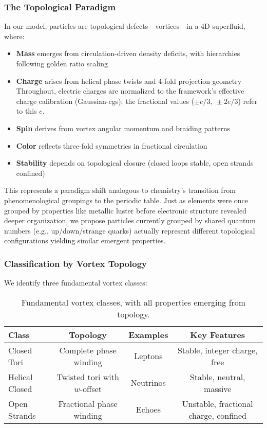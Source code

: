 \subsubsection{The Topological Paradigm}

In our model, particles are topological defects—vortices—in a 4D superfluid, where:
\begin{itemize}
\item \textbf{Mass} emerges from circulation-driven density deficits, with hierarchies following golden ratio scaling
\item \textbf{Charge} arises from helical phase twists and 4-fold projection geometry
Throughout, electric charges are normalized to the framework's effective charge calibration (Gaussian-cgs); the fractional values ($\pm e/3,\ \pm 2e/3$) refer to this $e$.
\item \textbf{Spin} derives from vortex angular momentum and braiding patterns
\item \textbf{Color} reflects three-fold symmetries in fractional circulation
\item \textbf{Stability} depends on topological closure (closed loops stable, open strands confined)
\end{itemize}

This represents a paradigm shift analogous to chemistry's transition from phenomenological groupings to the periodic table. Just as elements were once grouped by properties like metallic luster before electronic structure revealed deeper organization, we propose particles currently grouped by shared quantum numbers (e.g., up/down/strange quarks) actually represent different topological configurations yielding similar emergent properties.

\subsubsection{Classification by Vortex Topology}

We identify three fundamental vortex classes:

\begin{table}[h!]
\centering
\begin{tabular}{|l|c|c|c|}
\hline
Class & Topology & Examples & Key Features \\
\hline
Closed Tori & Complete phase winding & Leptons & Stable, integer charge, free \\
Helical Closed & Twisted tori with $w$-offset & Neutrinos & Stable, neutral, massive \\
Open Strands & Fractional phase winding & Echoes & Unstable, fractional charge, confined \\
\hline
\end{tabular}
\caption{Fundamental vortex classes, with all properties emerging from topology.}
\end{table}

